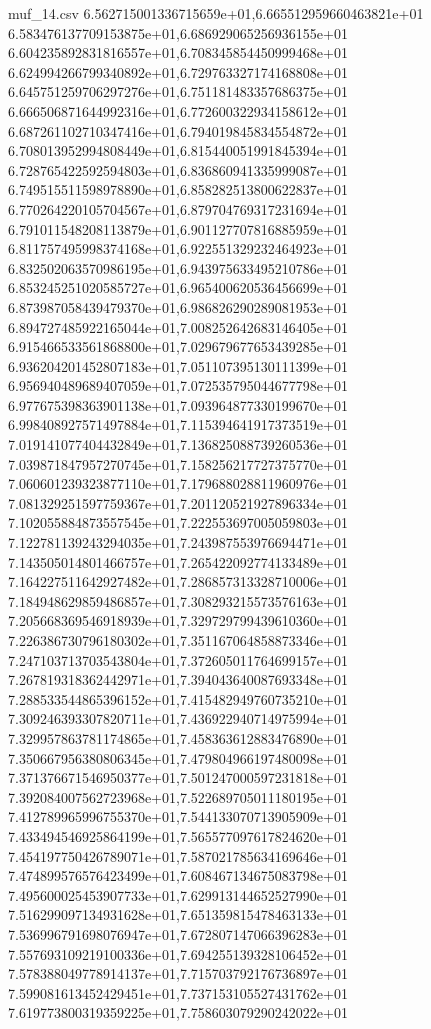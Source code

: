 \begin{filecontents*}{muf_14.csv}
6.562715001336715659e+01,6.665512959660463821e+01
6.583476137709153875e+01,6.686929065256936155e+01
6.604235892831816557e+01,6.708345854450999468e+01
6.624994266799340892e+01,6.729763327174168808e+01
6.645751259706297276e+01,6.751181483357686375e+01
6.666506871644992316e+01,6.772600322934158612e+01
6.687261102710347416e+01,6.794019845834554872e+01
6.708013952994808449e+01,6.815440051991845394e+01
6.728765422592594803e+01,6.836860941335999087e+01
6.749515511598978890e+01,6.858282513800622837e+01
6.770264220105704567e+01,6.879704769317231694e+01
6.791011548208113879e+01,6.901127707816885959e+01
6.811757495998374168e+01,6.922551329232464923e+01
6.832502063570986195e+01,6.943975633495210786e+01
6.853245251020585727e+01,6.965400620536456699e+01
6.873987058439479370e+01,6.986826290289081953e+01
6.894727485922165044e+01,7.008252642683146405e+01
6.915466533561868800e+01,7.029679677653439285e+01
6.936204201452807183e+01,7.051107395130111399e+01
6.956940489689407059e+01,7.072535795044677798e+01
6.977675398363901138e+01,7.093964877330199670e+01
6.998408927571497884e+01,7.115394641917373519e+01
7.019141077404432849e+01,7.136825088739260536e+01
7.039871847957270745e+01,7.158256217727375770e+01
7.060601239323877110e+01,7.179688028811960976e+01
7.081329251597759367e+01,7.201120521927896334e+01
7.102055884873557545e+01,7.222553697005059803e+01
7.122781139243294035e+01,7.243987553976694471e+01
7.143505014801466757e+01,7.265422092774133489e+01
7.164227511642927482e+01,7.286857313328710006e+01
7.184948629859486857e+01,7.308293215573576163e+01
7.205668369546918939e+01,7.329729799439610360e+01
7.226386730796180302e+01,7.351167064858873346e+01
7.247103713703543804e+01,7.372605011764699157e+01
7.267819318362442971e+01,7.394043640087693348e+01
7.288533544865396152e+01,7.415482949760735210e+01
7.309246393307820711e+01,7.436922940714975994e+01
7.329957863781174865e+01,7.458363612883476890e+01
7.350667956380806345e+01,7.479804966197480098e+01
7.371376671546950377e+01,7.501247000597231818e+01
7.392084007562723968e+01,7.522689705011180195e+01
7.412789965996755370e+01,7.544133070713905909e+01
7.433494546925864199e+01,7.565577097617824620e+01
7.454197750426789071e+01,7.587021785634169646e+01
7.474899576576423499e+01,7.608467134675083798e+01
7.495600025453907733e+01,7.629913144652527990e+01
7.516299097134931628e+01,7.651359815478463133e+01
7.536996791698076947e+01,7.672807147066396283e+01
7.557693109219100336e+01,7.694255139328106452e+01
7.578388049778914137e+01,7.715703792176736897e+01
7.599081613452429451e+01,7.737153105527431762e+01
7.619773800319359225e+01,7.758603079290242022e+01

\end{filecontents*}
